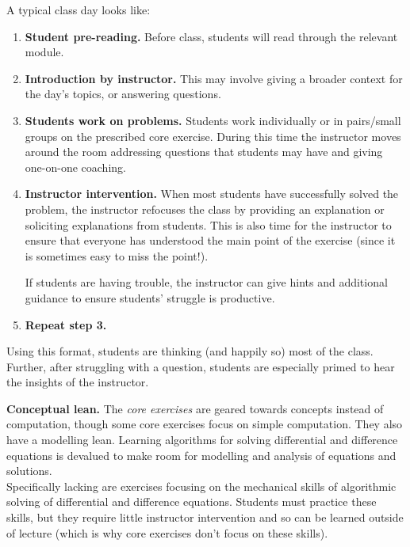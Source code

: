 A typical class day looks like:
\begin{enumerate}
	\item {\bf Student pre-reading.} Before class, students will read through the relevant module.

	\item {\bf Introduction by instructor.} This may involve giving 	a broader context for the day's topics, or answering questions.

	\item {\bf Students work on problems.} Students work individually or in pairs/small groups
		on the prescribed core exercise. During this time the instructor moves
		around the room addressing questions that students may have and giving
		one-on-one coaching.

	\item {\bf Instructor intervention.} When most students have successfully solved
		the problem, the instructor refocuses the class by providing an
		explanation or soliciting explanations from students.
		This is also time for the instructor to ensure that everyone has
		understood the main point of the exercise (since it is sometimes
		easy to miss the point!).

		If students are having trouble, the instructor can give hints
		and additional guidance to ensure students' struggle is productive.

	\item {\bf Repeat step 3.}
\end{enumerate}

Using this format, students are thinking (and happily so) most of the class. Further,
after struggling with a question, students are especially primed to hear the insights of the instructor.

{\bf Conceptual lean.}
The \emph{core exercises} are geared towards concepts instead of computation, though some core exercises focus on simple computation. They also have a modelling lean. 
Learning algorithms for solving differential and difference equations is devalued to make room for modelling and analysis of equations and solutions. \\

Specifically lacking are exercises focusing on the mechanical skills of algorithmic solving of differential and difference equations. Students must practice these skills, but they require little instructor intervention and so can be learned outside of lecture (which is why core exercises don't focus on these skills).


